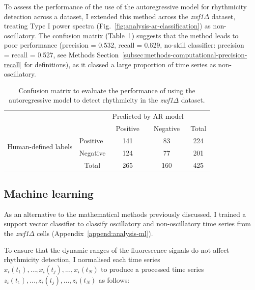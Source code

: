 To assess the performance of the use of the autoregressive model for rhythmicity detection across a dataset, I extended this method across the \textit{zwf1$\Delta$} dataset, treating Type I power spectra (Fig.\ \ref{fig:analysis-ar-classification}) as non-oscillatory.
The confusion matrix (Table~\ref{tab:analysis-ar-confusion-matrix}) suggests that the method leads to poor performance (precision = 0.532, recall = 0.629, no-skill classifier: precision = recall = 0.527, see Methods Section~\ref{subsec:methods-computational-precision-recall} for definitions), as it classed a large proportion of time series as non-oscillatory.

\begin{table}[h!]
  \centering
  \begin{tabular}{l|l|c|c|c}
    \multicolumn{2}{c}{}&\multicolumn{2}{c}{Predicted by AR model}&\\
    \cline{3-4}
    \multicolumn{2}{c|}{}&Positive&Negative&\multicolumn{1}{c}{Total}\\
    \cline{2-4}
    \multirow{2}{*}{Human-defined labels}& Positive & 141 & 83 & 224\\
    \cline{2-4}
    & Negative & 124 & 77 & 201\\
    \cline{2-4}
    \multicolumn{1}{c}{} & \multicolumn{1}{c}{Total} & \multicolumn{1}{c}{265} & \multicolumn{1}{c}{160} & \multicolumn{1}{c}{425}\\
  \end{tabular}
  \caption[
    Confusion matrix to evaluate the performance of using the autoregressive model \parencite{jiaFrequencyDomainAnalysis2020} to detect rhythmicity.
  ]{
    Confusion matrix to evaluate the performance of using the autoregressive model \parencite{jiaFrequencyDomainAnalysis2020} to detect rhythmicity in the \textit{zwf1$\Delta$} dataset.
  }
  \label{tab:analysis-ar-confusion-matrix}
\end{table}


\subsection{Machine learning}
\label{subsec:analysis-classification-ml}

As an alternative to the mathematical methods previously discussed, I trained a support vector classifier to classify oscillatory and non-oscillatory time series from the \textit{zwf1$\Delta$} cells (Appendix~\ref{append:analysis-ml}).

To ensure that the dynamic ranges of the fluorescence signals do not affect rhythmicity detection, I normalised each time series $x_{i}(t_{1}), \ldots , x_{i}(t_{j}), \ldots , x_{i}(t_{N})$ to produce a processed time series $z_{i}(t_{1}), \ldots , z_{i}(t_{j}), \ldots , z_{i}(t_{N})$ as follows:

